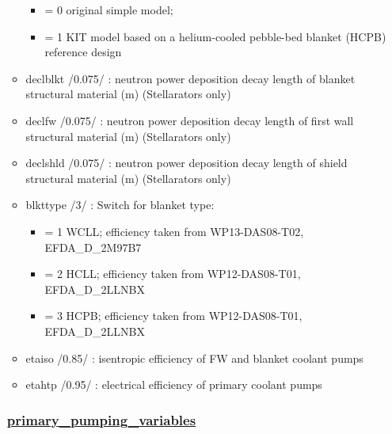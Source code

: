 \documentclass[
]{article}
\providecommand{\tightlist}{%
  \setlength{\itemsep}{0pt}\setlength{\parskip}{0pt}}
\begin{document}
\begin{itemize}
\begin{itemize}
    \begin{itemize}
    \tightlist
    \item
      = 0 original simple model;
    \item
      = 1 KIT model based on a helium-cooled pebble-bed blanket (HCPB)
      reference design
    \end{itemize}
  \item
    declblkt /0.075/ : neutron power deposition decay length of blanket
    structural material (m) (Stellarators only)
  \item
    declfw /0.075/ : neutron power deposition decay length of first wall
    structural material (m) (Stellarators only)
  \item
    declshld /0.075/ : neutron power deposition decay length of shield
    structural material (m) (Stellarators only)
  \item
    blkttype /3/ : Switch for blanket type:

    \begin{itemize}
    \tightlist
    \item
      = 1 WCLL; efficiency taken from WP13-DAS08-T02, EFDA\_D\_2M97B7
    \item
      = 2 HCLL; efficiency taken from WP12-DAS08-T01, EFDA\_D\_2LLNBX
    \item
      = 3 HCPB; efficiency taken from WP12-DAS08-T01, EFDA\_D\_2LLNBX
    \end{itemize}
  \item
    etaiso /0.85/ : isentropic efficiency of FW and blanket coolant
    pumps
  \item
    etahtp /0.95/ : electrical efficiency of primary coolant pumps
  \end{itemize}

  \hypertarget{primary_pumping_variables}{%
  \subsubsection{\texorpdfstring{\href{primary_pumping_variables.html}{primary\_pumping\_variables}}{primary\_pumping\_variables}}\label{primary_pumping_variables}}


\end{itemize}
\end{document}
